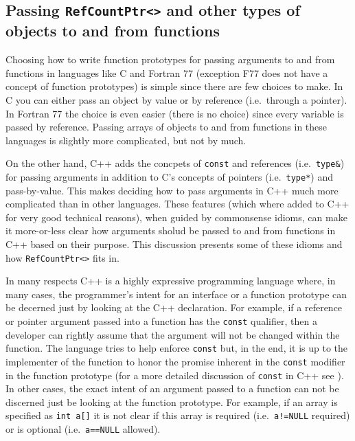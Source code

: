 %
\subsection{Passing {}\texttt{RefCountPtr<>} and other types of objects to and from functions}
\label{rcp:sec:passing-args}
%

Choosing how to write function prototypes for passing arguments to and
from functions in languages like C and Fortran 77 (exception F77 does
not have a concept of function prototypes) is simple since there are
few choices to make.  In C you can either pass an object by value or
by reference (i.e.~through a pointer).  In Fortran 77 the choice is
even easier (there is no choice) since every variable is passed by
reference.  Passing arrays of objects to and from functions in these
languages is slightly more complicated, but not by much.

On the other hand, C++ adds the concpets of {}\texttt{const} and
references (i.e.~{}\texttt{type\&}) for passing arguments in addition
to C's concepts of pointers (i.e.~{}\texttt{type*}) and pass-by-value.
This makes deciding how to pass arguments in C++ much more complicated
than in other languages.  These features (which where added to C++ for
very good technical reasons), when guided by commonsense idioms, can
make it more-or-less clear how arguments sholud be passed to and from
functions in C++ based on their purpose.  This discussion presents
some of these idioms and how {}\texttt{RefCountPtr<>} fits in.

In many respects C++ is a highly expressive programming language
where, in many cases, the programmer's intent for an interface or a
function prototype can be decerned just by looking at the C++
declaration.  For example, if a reference or pointer argument passed
into a function has the {}\texttt{const} qualifier, then a developer
can rightly assume that the argument will not be changed within the
function.  The language tries to help enforce {}\texttt{const} but, in
the end, it is up to the implementer of the function to honor the
promise inherent in the {}\texttt{const} modifier in the function
prototype (for a more detailed discussion of {}\texttt{const} in C++
see {}\cite[Section 10.2.7.1]{ref:stroustrup_2000}).  In other cases,
the exact intent of an argument passed to a function can not be
discerned just be looking at the function prototype.  For example, if
an array is specified as {}\texttt{int a[]} it is not clear if this
array is required (i.e.~{}\texttt{a!=NULL} required) or is optional
(i.e.~{}\texttt{a==NULL} allowed).

